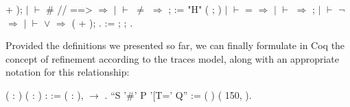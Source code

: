 \begin{coqdoccode}
	+  ); \coqdoceol
	\coqdocindent{1.00em}
	\ensuremath{|} \ensuremath{\vdash} \coqdocvar{\_} \#  //  ==> \coqdocvar{\_} \ensuremath{\Rightarrow}  \coqdoceol
	\coqdocindent{1.00em}
	\ensuremath{|} \ensuremath{\vdash} \coqdocvar{\_} \ensuremath{\not=} \coqdocvar{\_} \ensuremath{\Rightarrow}  ;   :=  "H"  ( ;  )\coqdoceol
	\coqdocindent{1.00em}
	\ensuremath{|} \ensuremath{\vdash} \coqdocvar{\_} = \coqdocvar{\_} \ensuremath{\Rightarrow} \coqdoceol
	\coqdocindent{1.00em}
	\ensuremath{|} \ensuremath{\vdash}  \coqdocvar{\_} \coqdocvar{\_} \ensuremath{\Rightarrow} ; \coqdoceol
	\coqdocindent{1.00em}
	\ensuremath{|} \ensuremath{\vdash} \ensuremath{\lnot}  \coqdocvar{\_} \coqdocvar{\_} \ensuremath{\Rightarrow} \coqdoceol
	\coqdocindent{1.00em}
	\ensuremath{|} \ensuremath{\vdash} \coqdocvar{\_} \ensuremath{\lor} \coqdocvar{\_} \ensuremath{\Rightarrow} ( + ); \coqdoceol
	\coqdocindent{1.00em}
	.\coqdoceol
	\coqdocemptyline
	\coqdocnoindent
	  :=  ; ; .\coqdoceol
\end{coqdoccode}

Provided the definitions we presented so far, we can finally formulate in Coq the concept of refinement according to the traces model, along with an appropriate notation for this relationship:

\begin{coqdoccode}
	\coqdocnoindent
	  ( : ) (  : ) :  :=\coqdoceol
	\coqdocindent{1.00em}
	\coqdockw{\ensuremath{\forall}} ( : ),     \ensuremath{\rightarrow}    .\coqdoceol
	\coqdocemptyline
	\coqdocnoindent
	 ``S '\#' P '[T=' Q'' := (   ) (  150,  ).\coqdoceol
\end{coqdoccode}

